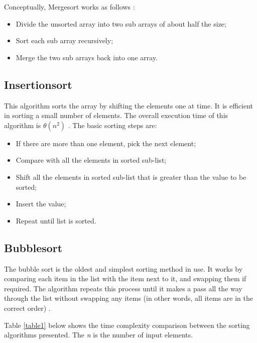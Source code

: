 Conceptually, Mergesort works as follows \cite{Abhyankar2011}:
\begin{itemize}
    \item Divide the unsorted array into two sub arrays of about half the size;
    \item Sort each sub array recursively;
    \item Merge the two sub arrays back into one array.
\end{itemize}

\subsection{Insertionsort}

This algorithm sorts the array by shifting the elements one at time. It is efficient in sorting a small number of elements. The overall execution time of this algorithm is $\theta(n^2)$ \cite{Cormen2009}. The basic sorting steps are:
\begin{itemize}
    \item If there are more than one element, pick the next element;
    \item Compare with all the elements in sorted sub-list;
    \item Shift all the elements in sorted sub-list that is greater than the value to be sorted;
    \item Insert the value;
    \item Repeat until list is sorted.
\end{itemize}

\subsection{Bubblesort}

The bubble sort is the oldest and simplest sorting method in use. It works by comparing each item in the list with the item next to it, and swapping them if required. The algorithm repeats this process until it makes a pass all the way through the list without swapping any items (in other words, all items are in the correct order) \cite{Mansotra2011}.

Table \ref{table1} below shows the time complexity comparison between the sorting algorithms presented. The \textit{n} is the number of input elements.

